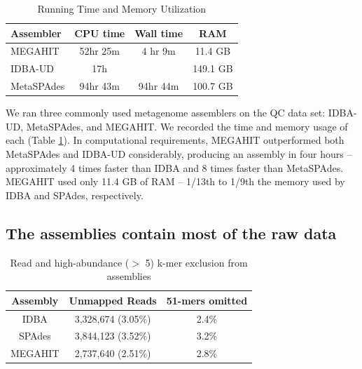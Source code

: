 \documentclass[11pt]{article}
\begin{document}
 \begin{table}[h]
\caption{Running Time and Memory Utilization}
\centering
\begin{tabular}{|l|c|c|c|}
\hline
\textbf{Assembler} & \textbf{CPU time} & \textbf{Wall time} & \textbf{RAM} \\ [0.5ex]
\hline
MEGAHIT & 52hr 25m & 4 hr 9m & 11.4 GB \\
\hline
IDBA-UD & 17h & & 149.1 GB \\
\hline
MetaSPAdes & 94hr 43m & 94hr 44m & 100.7 GB \\
\hline

\end{tabular}
\label{table:time-memory}
\end{table}

 We ran three commonly used metagenome assemblers on the QC data set:
IDBA-UD, MetaSPAdes, and MEGAHIT. We recorded the time and memory usage of
each (Table \ref{table:time-memory}).  In computational requirements, MEGAHIT outperformed both
MetaSPAdes and IDBA-UD considerably, producing an assembly in four hours --
approximately 4 times faster than IDBA and 8 times faster than
MetaSPAdes.  MEGAHIT used only 11.4 GB of RAM -- 1/13th to 1/9th
the memory used by IDBA and SPAdes, respectively.


\subsection*{The assemblies contain most of the raw data}






\begin{table}[!h]
\centering
\caption{Read and high-abundance ($>$ 5) k-mer exclusion from assemblies}
\begin{tabular}{|c|c|c|}\hline
  \textbf{Assembly} & \textbf{Unmapped Reads} & \textbf {51-mers omitted}
  \\ \hline
IDBA &3,328,674 (3.05\%)&  2.4\% \\ \hline
SPAdes &3,844,123 (3.52\%) &  3.2\% \\ \hline
MEGAHIT &2,737,640 (2.51\%) &   2.8\% \\ \hline
\end{tabular}
\label{table:reads-kmers}
\end{table}
\end{document}
